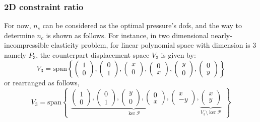 \subsubsection{2D constraint ratio}
For now, $n_s$ can be considered as the optimal pressure's dofs, and the way to determine $n_c$ is shown as follows. For instance, in two dimensional nearly-incompressible elasticity problem, for linear polynomial space with dimension is 3 namely $P_3$, the counterpart displacement space $V_3$ is given by:
\begin{equation}
V_3 = \mathrm{span} \left \{
\begin{pmatrix} 1 \\ 0 \end{pmatrix},
\begin{pmatrix} 0 \\ 1 \end{pmatrix},
\begin{pmatrix} x \\ 0 \end{pmatrix},
\begin{pmatrix} 0 \\ x \end{pmatrix},
\begin{pmatrix} y \\ 0 \end{pmatrix},
\begin{pmatrix} 0 \\ y \end{pmatrix}
\right \}
\end{equation}
or rearranged as follows,
\begin{equation}\label{base1}
V_3 = \mathrm{span} 
\begin{Bmatrix}
\underbrace{
\begin{pmatrix} 1 \\ 0 \end{pmatrix},
\begin{pmatrix} 0 \\ 1 \end{pmatrix},
\begin{pmatrix} y \\ 0 \end{pmatrix},
\begin{pmatrix} 0 \\ x \end{pmatrix},
\begin{pmatrix} x \\ -y \end{pmatrix}
}_{\ker \mathcal P},
\underbrace{
\begin{pmatrix} x \\ y \end{pmatrix}
}_{V_3\setminus \ker \mathcal P}
\end{Bmatrix}
\end{equation}
